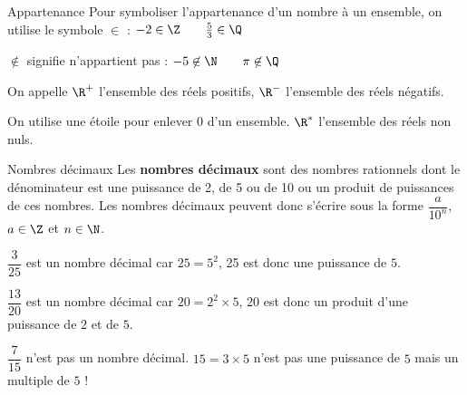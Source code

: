 \begin{pageCours}
%
%

 

\begin{DefT}{Appartenance}
Pour symboliser l'appartenance d'un nombre à un ensemble, on utilise le symbole $\in$ : 
$-2 \in \Z \quad \quad \frac{5}{3} \in \Q $ 
 
 $ \not\in $ signifie n'appartient pas : $-5 \not \in \N \quad \quad \pi \not\in \Q$
\end{DefT}


\begin{Nt}

\begin{description}[leftmargin=*]
\item  On appelle $\R^+$ l'ensemble des réels positifs, $\R^-$ l'ensemble des réels négatifs.
\item  On utilise une étoile pour enlever $0$ d'un ensemble. $\R^*$ l'ensemble des réels non nuls.
\end{description}

\end{Nt}

\begin{DefT}{Nombres décimaux}
Les \textbf{nombres décimaux} sont des nombres rationnels dont le dénominateur est une puissance de 2, de 5 ou de 10 ou un produit de puissances de ces nombres. Les nombres décimaux peuvent donc s'écrire sous la forme $\dfrac{a}{10^n}$, $a \in \Z$ et $n \in \N$.
\end{DefT}

\begin{Ex}
\begin{description}[leftmargin=*]
\item  $\dfrac{3}{25}$ est un nombre décimal car $25 = 5^2$, 25 est donc une puissance de $5$.
\item  $\dfrac{13}{20}$ est un nombre décimal car $20 = 2^2 \times 5$, $20$ est donc un produit d'une puissance de $2$ et de $5$.
\end{description}
\end{Ex}

\begin{Att}

$\dfrac{7}{15}$ n'est pas un nombre décimal. $15=3 \times 5$ n'est pas une puissance de $5$ mais un multiple de $5$ !

\end{Att}







\end{pageCours} 

